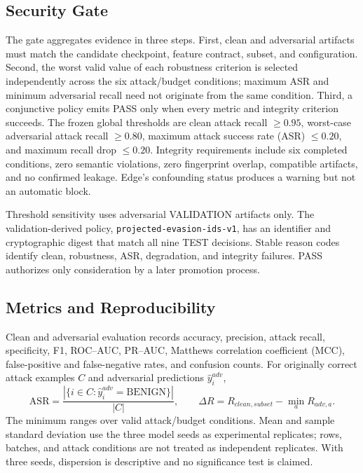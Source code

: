 \documentclass[runningheads]{llncs}
\begin{document}
\subsection{Security Gate}
The gate aggregates evidence in three steps. First, clean and adversarial artifacts must match the candidate checkpoint, feature contract, subset, and configuration. Second, the worst valid value of each robustness criterion is selected independently across the six attack/budget conditions; maximum ASR and minimum adversarial recall need not originate from the same condition. Third, a conjunctive policy emits PASS only when every metric and integrity criterion succeeds. The frozen global thresholds are clean attack recall $\geq0.95$, worst-case adversarial attack recall $\geq0.80$, maximum attack success rate (ASR) $\leq0.20$, and maximum recall drop $\leq0.20$. Integrity requirements include six completed conditions, zero semantic violations, zero fingerprint overlap, compatible artifacts, and no confirmed leakage. Edge's confounding status produces a warning but not an automatic block.

Threshold sensitivity uses adversarial VALIDATION artifacts only. The validation-derived policy, \texttt{projected-evasion-ids-v1}, has an identifier and cryptographic digest that match all nine TEST decisions. Stable reason codes identify clean, robustness, ASR, degradation, and integrity failures. PASS authorizes only consideration by a later promotion process.

\subsection{Metrics and Reproducibility}
Clean and adversarial evaluation records accuracy, precision, attack recall, specificity, F1, ROC--AUC, PR--AUC, Matthews correlation coefficient (MCC), false-positive and false-negative rates, and confusion counts. For originally correct attack examples $C$ and adversarial predictions $\hat y_i^{adv}$,
\begin{equation}
\mathrm{ASR}=\frac{|\{i\in C:\hat y_i^{adv}=\mathrm{BENIGN}\}|}{|C|},\qquad
\Delta R=R_{clean,subset}-\min_a R_{adv,a}.
\end{equation}
The minimum ranges over valid attack/budget conditions. Mean and sample standard deviation use the three model seeds as experimental replicates; rows, batches, and attack conditions are not treated as independent replicates. With three seeds, dispersion is descriptive and no significance test is claimed.
\end{document}
